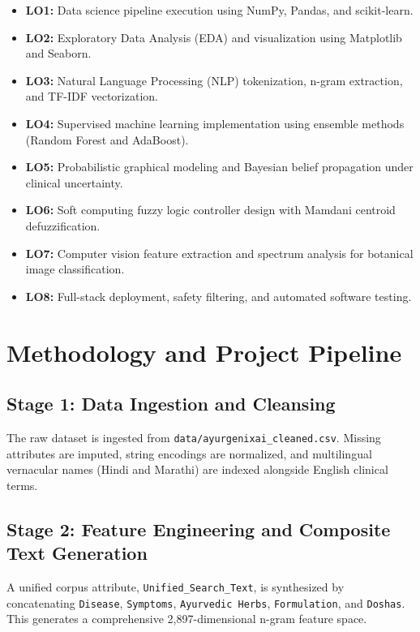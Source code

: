 \documentclass[12pt,a4paper]{article}
\begin{document}
\begin{itemize}
    \item \textbf{LO1:} Data science pipeline execution using NumPy, Pandas, and scikit-learn.
    \item \textbf{LO2:} Exploratory Data Analysis (EDA) and visualization using Matplotlib and Seaborn.
    \item \textbf{LO3:} Natural Language Processing (NLP) tokenization, n-gram extraction, and TF-IDF vectorization.
    \item \textbf{LO4:} Supervised machine learning implementation using ensemble methods (Random Forest and AdaBoost).
    \item \textbf{LO5:} Probabilistic graphical modeling and Bayesian belief propagation under clinical uncertainty.
    \item \textbf{LO6:} Soft computing fuzzy logic controller design with Mamdani centroid defuzzification.
    \item \textbf{LO7:} Computer vision feature extraction and spectrum analysis for botanical image classification.
    \item \textbf{LO8:} Full-stack deployment, safety filtering, and automated software testing.
\end{itemize}

\newpage
\section{Methodology and Project Pipeline}

\subsection{Stage 1: Data Ingestion and Cleansing}
The raw dataset is ingested from \texttt{data/ayurgenixai\_cleaned.csv}. Missing attributes are imputed, string encodings are normalized, and multilingual vernacular names (Hindi and Marathi) are indexed alongside English clinical terms.

\subsection{Stage 2: Feature Engineering and Composite Text Generation}
A unified corpus attribute, \texttt{Unified\_Search\_Text}, is synthesized by concatenating \texttt{Disease}, \texttt{Symptoms}, \texttt{Ayurvedic Herbs}, \texttt{Formulation}, and \texttt{Doshas}. This generates a comprehensive 2,897-dimensional n-gram feature space.
\end{document}
